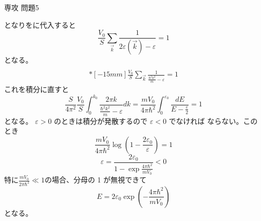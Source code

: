 \documentclass[fleqn]{jbook}
\begin{document}
\begin{answer}{専攻 問題5}{}
\begin{subanswers}
となりをに代入すると
\[
\frac{V_0}{S}\sum_{\vec{k}}\frac{1}{2\varepsilon(\vec{k})-\varepsilon}=1
\]
となる。
\SubAnswer
\begin{eqnarray*}
\\*[-15mm]
\frac{V_0}{S}\sum_{\vec{k}}\frac{1}{\frac {\hbar^2 k^2} {m}-\varepsilon}=1
\end{eqnarray*}
これを積分に直すと
\[
\frac {S} {4\pi^2} \frac {V_0}{S}
\int^{k_0}_{0} \frac {2\pi k}{\frac {\hbar^2 k^2} {m}-\varepsilon} dk =
\frac {mV_0}{4\pi \hbar^2} \int^{\varepsilon_0}_{0}
\frac {dE} {E- \frac {\varepsilon} {2}} = 1
\]
となる。
$\varepsilon > 0$ のときは積分が発散するので $\varepsilon < 0$ でなければ
ならない。このとき
\[
\frac {mV_0}{4\pi \hbar^2} \log (1-\frac {2\varepsilon_0}{\varepsilon}) = 1
\]
\[
\varepsilon = \frac {2\varepsilon_0}{1- \exp \frac{4\pi \hbar^2}{mV_0}} < 0
\]
特に$\displaystyle{
\frac {mV_0}{2\pi \hbar^2} \ll 1}$の場合、分母の 1 が無視できて
\[
E = 2\varepsilon_0 \exp \left(- \frac {4\pi \hbar^2}{mV_0}\right)
\]
となる。

\end{subanswers}

\end{answer}
\end{document}

